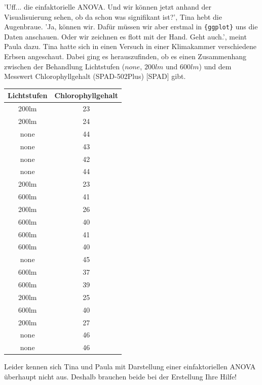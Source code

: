 \documentclass[a4paper, 9pt]{scrartcl}\usepackage[]{graphicx}\usepackage[]{xcolor}
\newenvironment{knitrout}{}{} %
\begin{document}
'Uff... die einfaktorielle ANOVA. Und wir können jetzt anhand der Visualisuierung sehen, ob da schon was signifikant ist?', Tina hebt die Augenbraue. 'Ja, können wir. Dafür müssen wir aber erstmal in \texttt{\{ggplot\}} uns die Daten anschauen. Oder wir zeichnen es flott mit der Hand. Geht auch.', meint Paula dazu. Tina hatte sich in einen Versuch in einer Klimakammer verschiedene Erbsen angeschaut. Dabei ging es herauszufinden, ob es einen Zusammenhang zwischen der Behandlung Lichtstufen ($none$, $200lm$ und $600lm$) und dem Messwert Chlorophyllgehalt (SPAD-502Plus) [SPAD] gibt.

\begin{knitrout}
\color{fgcolor}\begin{table}[!h]
\centering
\begin{tabular}{cc}
\toprule
Lichtstufen & Chlorophyllgehalt\\
\midrule
200lm & 23\\
200lm & 24\\
none & 44\\
none & 43\\
none & 42\\
\addlinespace
none & 44\\
200lm & 23\\
600lm & 41\\
200lm & 26\\
600lm & 40\\
\addlinespace
600lm & 41\\
600lm & 40\\
none & 45\\
600lm & 37\\
600lm & 39\\
\addlinespace
200lm & 25\\
600lm & 40\\
200lm & 27\\
none & 46\\
none & 46\\
\bottomrule
\end{tabular}
\end{table}

\end{knitrout}

Leider kennen sich Tina und Paula mit Darstellung einer einfaktoriellen ANOVA überhaupt nicht aus. Deshalb brauchen beide bei der Erstellung Ihre Hilfe! 
\end{document}
